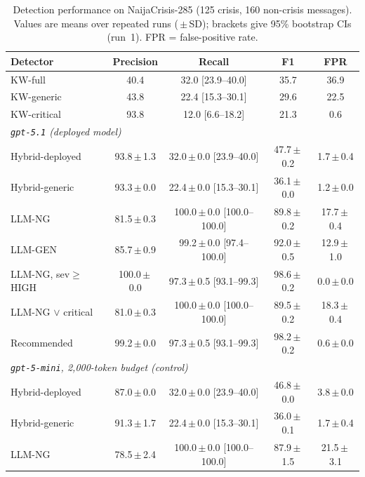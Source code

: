 \begin{table}[t]\centering\small
\caption{Detection performance on NaijaCrisis-285 (125 crisis, 160 non-crisis messages). Values are means over repeated runs (\,$\pm$\,SD); brackets give 95\% bootstrap CIs (run~1). FPR = false-positive rate.}
\label{tab:main}
\begin{tabular}{lcccc}\toprule
Detector & Precision & Recall & F1 & FPR \\\midrule
KW-full & 40.4 & 32.0 {\scriptsize[23.9--40.0]} & 35.7 & 36.9 \\
KW-generic & 43.8 & 22.4 {\scriptsize[15.3--30.1]} & 29.6 & 22.5 \\
KW-critical & 93.8 & 12.0 {\scriptsize[6.6--18.2]} & 21.3 & 0.6 \\
\midrule\multicolumn{5}{l}{\textit{\texttt{gpt-5.1} (deployed model)}}\\
Hybrid-deployed & 93.8\,$\pm$\,1.3 & 32.0\,$\pm$\,0.0 {\scriptsize[23.9--40.0]} & 47.7\,$\pm$\,0.2 & 1.7\,$\pm$\,0.4 \\
Hybrid-generic & 93.3\,$\pm$\,0.0 & 22.4\,$\pm$\,0.0 {\scriptsize[15.3--30.1]} & 36.1\,$\pm$\,0.0 & 1.2\,$\pm$\,0.0 \\
LLM-NG & 81.5\,$\pm$\,0.3 & 100.0\,$\pm$\,0.0 {\scriptsize[100.0--100.0]} & 89.8\,$\pm$\,0.2 & 17.7\,$\pm$\,0.4 \\
LLM-GEN & 85.7\,$\pm$\,0.9 & 99.2\,$\pm$\,0.0 {\scriptsize[97.4--100.0]} & 92.0\,$\pm$\,0.5 & 12.9\,$\pm$\,1.0 \\
LLM-NG, sev$\geq$HIGH & 100.0\,$\pm$\,0.0 & 97.3\,$\pm$\,0.5 {\scriptsize[93.1--99.3]} & 98.6\,$\pm$\,0.2 & 0.0\,$\pm$\,0.0 \\
LLM-NG $\lor$ critical & 81.0\,$\pm$\,0.3 & 100.0\,$\pm$\,0.0 {\scriptsize[100.0--100.0]} & 89.5\,$\pm$\,0.2 & 18.3\,$\pm$\,0.4 \\
Recommended & 99.2\,$\pm$\,0.0 & 97.3\,$\pm$\,0.5 {\scriptsize[93.1--99.3]} & 98.2\,$\pm$\,0.2 & 0.6\,$\pm$\,0.0 \\
\midrule\multicolumn{5}{l}{\textit{\texttt{gpt-5-mini}, 2{,}000-token budget (control)}}\\
Hybrid-deployed & 87.0\,$\pm$\,0.0 & 32.0\,$\pm$\,0.0 {\scriptsize[23.9--40.0]} & 46.8\,$\pm$\,0.0 & 3.8\,$\pm$\,0.0 \\
Hybrid-generic & 91.3\,$\pm$\,1.7 & 22.4\,$\pm$\,0.0 {\scriptsize[15.3--30.1]} & 36.0\,$\pm$\,0.1 & 1.7\,$\pm$\,0.4 \\
LLM-NG & 78.5\,$\pm$\,2.4 & 100.0\,$\pm$\,0.0 {\scriptsize[100.0--100.0]} & 87.9\,$\pm$\,1.5 & 21.5\,$\pm$\,3.1 \\

\end{tabular}
\end{table}
